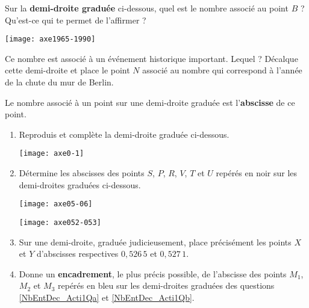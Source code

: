 \begin{activite}

\begin{partie}
Sur la \textbf{demi-droite graduée} ci-dessous, quel est le nombre associé au point $B$ ? Qu'est-ce qui te permet de l'affirmer ?

\texttt{[image: axe1965-1990]}

Ce nombre est associé à un événement historique important. Lequel ?
Décalque cette demi-droite et place le point $N$ associé au nombre qui correspond à l'année de la chute du mur de Berlin.

Le nombre associé à un point sur une demi-droite graduée est l'\textbf{abscisse} de ce point.

\end{partie}

\begin{partie}
\begin{enumerate}
 \item Reproduis et complète la demi-droite graduée ci-dessous. \label{NbEntDec_Acti1Qa}
 
 \texttt{[image: axe0-1]}
 
 \item Détermine les abscisses des points $S$, $P$, $R$, $V$, $T$ et $U$ repérés en noir sur les demi-droites graduées ci-dessous.\label{NbEntDec_Acti1Qb}
 
\texttt{[image: axe05-06]}

\texttt{[image: axe052-053]}
 
 \item Sur une demi-droite, graduée judicieusement, place précisément les points $X$ et $Y$ d'abscisses respectives $0,526\,5$ et $0,527\,1$.
 \item Donne un \textbf{encadrement}, le plus précis possible, de l'abscisse des points $M_1$, $M_2$ et $M_3$ repérés en bleu sur les demi-droites graduées des questions \ref{NbEntDec_Acti1Qa} et \ref{NbEntDec_Acti1Qb}.
 \end{enumerate}
\end{partie}

\end{activite}




